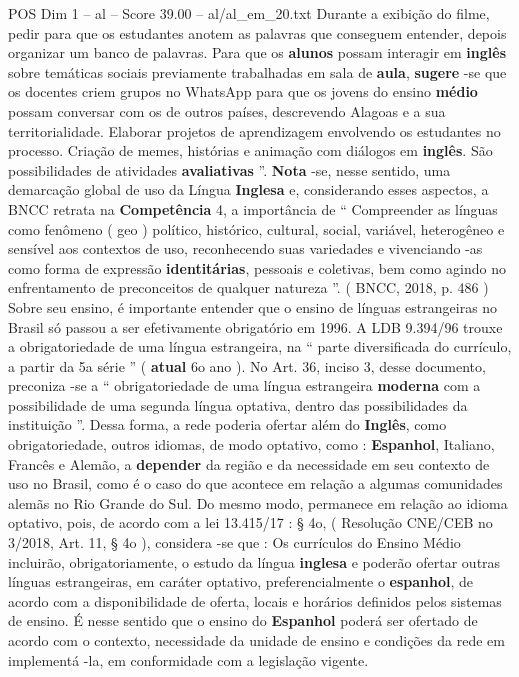 \begin{textsample}{POS Dim 1 – al – Score 39.00 – al/al\_em\_20.txt}
Durante a exibição do filme, pedir para que os estudantes anotem as palavras que conseguem entender, depois organizar um banco de palavras.
Para que os \textbf{alunos} possam interagir em \textbf{inglês} sobre temáticas sociais previamente trabalhadas em sala de \textbf{aula}, \textbf{sugere} -se que os docentes criem grupos no WhatsApp para que os jovens do ensino \textbf{médio} possam conversar com os de outros países, descrevendo Alagoas e a sua territorialidade.
Elaborar projetos de aprendizagem envolvendo os estudantes no processo.
Criação de memes, histórias e animação com diálogos em \textbf{inglês}.
São possibilidades de atividades \textbf{avaliativas} ”. \textbf{Nota} -se, nesse sentido, uma demarcação global de uso da Língua \textbf{Inglesa} e, considerando esses aspectos, a BNCC retrata na \textbf{Competência} 4, a importância de “ Compreender as línguas como fenômeno ( geo ) político, histórico, cultural, social, variável, heterogêneo e sensível aos contextos de uso, reconhecendo suas variedades e vivenciando -as como forma de expressão \textbf{identitárias}, pessoais e coletivas, bem como agindo no enfrentamento de preconceitos de qualquer natureza ”. ( BNCC, 2018, p. 486 ) Sobre seu ensino, é importante entender que o ensino de línguas estrangeiras no Brasil só passou a ser efetivamente obrigatório em 1996.
A LDB 9.394/96 trouxe a obrigatoriedade de uma língua estrangeira, na “ parte diversificada do currículo, a partir da 5a série ” ( \textbf{atual} 6o ano ).
No Art. 36, inciso 3, desse documento, preconiza -se a “ obrigatoriedade de uma língua estrangeira \textbf{moderna} com a possibilidade de uma segunda língua optativa, dentro das possibilidades da instituição ”.
Dessa forma, a rede poderia ofertar além do \textbf{Inglês}, como obrigatoriedade, outros idiomas, de modo optativo, como : \textbf{Espanhol}, Italiano, Francês e Alemão, a \textbf{depender} da região e da necessidade em seu contexto de uso no Brasil, como é o caso do que acontece em relação a algumas comunidades alemãs no Rio Grande do Sul.
Do mesmo modo, permanece em relação ao idioma optativo, pois, de acordo com a lei 13.415/17 : § 4o, ( Resolução CNE/CEB no 3/2018, Art. 11, § 4o ), considera -se que : Os currículos do Ensino Médio incluirão, obrigatoriamente, o estudo da língua \textbf{inglesa} e poderão ofertar outras línguas estrangeiras, em caráter optativo, preferencialmente o \textbf{espanhol}, de acordo com a disponibilidade de oferta, locais e horários definidos pelos sistemas de ensino.
É nesse sentido que o ensino do \textbf{Espanhol} poderá ser ofertado de acordo com o contexto, necessidade da unidade de ensino e condições da rede em implementá -la, em conformidade com a legislação vigente.

\end{textsample}

